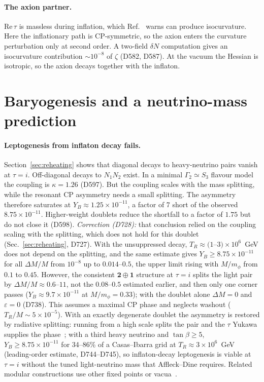 \documentclass[aps,prd,twocolumn,superscriptaddress,nofootinbib,floatfix]{revtex4-2}
\begin{document}
\paragraph{The axion partner.} $\mathrm{Re}\,\tau$ is massless during inflation, which Ref.~\cite{arXiv_2503_14904} warns can produce isocurvature. Here the inflationary path is CP-symmetric, so the axion enters the curvature perturbation only at second order. A two-field $\delta N$ computation gives an isocurvature contribution $\sim 10^{-8}$ of $\zeta$ (D582, D587). At the vacuum the Hessian is isotropic, so the axion decays together with the inflaton.

\section{Baryogenesis and a neutrino-mass prediction}\label{sec:baryo}
\paragraph{Leptogenesis from inflaton decay fails.} Section~\ref{sec:reheating} shows that diagonal decays to heavy-neutrino pairs vanish at $\tau = i$. Off-diagonal decays to $N_1N_2$ exist. In a minimal $\Gamma_2 \simeq S_3$ flavour model the coupling is $\kappa = 1.26$ (D597). But the coupling scales with the mass splitting, while the resonant CP asymmetry needs a small splitting. The asymmetry therefore saturates at $Y_B \approx 1.25\times10^{-11}$, a factor of 7 short of the observed $8.75\times10^{-11}$. Higher-weight doublets reduce the shortfall to a factor of $1.75$ but do not close it (D598). \emph{Correction (D728):} that conclusion relied on the coupling scaling with the splitting, which does not hold for this doublet (Sec.~\ref{sec:reheating}, D727). With the unsuppressed decay, $T_R\approx(1$--$3)\times10^6$~GeV does not depend on the splitting, and the same estimate gives $Y_B\ge8.75\times10^{-11}$ for all $\Delta M/M$ from $10^{-8}$ up to $0.014$--$0.5$, the upper limit rising with $M/m_\phi$ from $0.1$ to $0.45$. However, the consistent $\mathbf2\oplus\mathbf1$ structure at $\tau=i$ splits the light pair by $\Delta M/M\approx0.6$--$11$, not the $0.08$--$0.5$ estimated earlier, and then only one corner passes ($Y_B\approx9.7\times10^{-11}$ at $M/m_\phi=0.33$); with the doublet alone $\Delta M=0$ and $\varepsilon=0$ (D738). This assumes a maximal CP phase and neglects washout ($T_R/M\sim5\times10^{-5}$). With an exactly degenerate doublet the asymmetry is restored by radiative splitting: running from a high scale splits the pair and the $\tau$ Yukawa supplies the phase~\cite{BrancoRadLepto2005}; with a third heavy neutrino and $\tan\beta\ge5$, $Y_B\ge8.75\times10^{-11}$ for 34--86\% of a Casas--Ibarra grid at $T_R\approx3\times10^6$~GeV (leading-order estimate, D744--D745), so inflaton-decay leptogenesis is viable at $\tau=i$ without the tuned light-neutrino mass that Affleck--Dine requires. Related modular constructions use other fixed points or vacua~\cite{arXiv_2411_18603,arXiv_2604_04585}.
\end{document}
